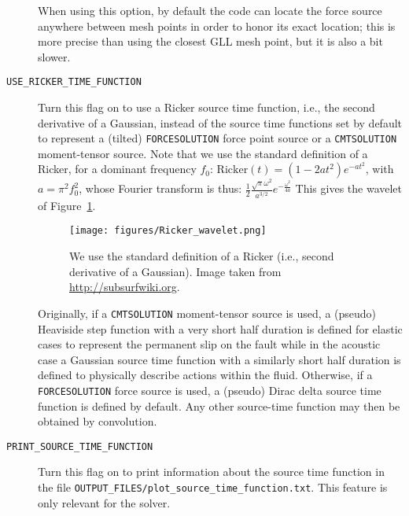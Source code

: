 \begin{description}
When using this option, by default the code can locate the force source
anywhere between mesh points in order to honor its exact location; this
is more precise than using the closest GLL mesh point, but it is also a bit slower.
\item [{\texttt{USE\_RICKER\_TIME\_FUNCTION}}] Turn this flag on to use
a Ricker source time function, i.e., the second derivative of a Gaussian, instead of the source time functions
set by default to represent a (tilted) \texttt{FORCESOLUTION} force
point source or a \texttt{CMTSOLUTION} moment-tensor source.
Note that we use the standard definition of a Ricker, for a dominant frequency $f_0$:
$\mathrm{Ricker}(t) = (1 - 2 a t^2) e^{-a t^2}$, with $a = \pi^2 f_0^2$,
whose Fourier transform is thus:
$\frac{1}{2} \frac{\sqrt{\pi}\omega^2}{a^{3/2}}e^{-\frac{\omega^2}{4 a}}$
This gives the wavelet of Figure~\ref{fig:RickerWavelet}.
\begin{figure}[htbp]
\centering
\texttt{[image: figures/Ricker\_wavelet.png]}
\caption{We use the standard definition of a Ricker (i.e., second derivative of a Gaussian). Image taken from \url{http://subsurfwiki.org}.}
\label{fig:RickerWavelet}
\end{figure}
Originally, if a \texttt{CMTSOLUTION} moment-tensor source is used, a (pseudo)
Heaviside step function with a very short half duration is defined
for elastic cases to represent the permanent slip on the fault while
in the acoustic case a Gaussian source time function with a similarly
short half duration is defined to physically describe actions within
the fluid. Otherwise, if a \texttt{FORCESOLUTION} force source is
used, a (pseudo) Dirac delta source time function is defined by default.
Any other source-time function may then be obtained by convolution.
\item [{\texttt{PRINT\_SOURCE\_TIME\_FUNCTION}}] Turn this flag on to print
information about the source time function in the file \texttt{OUTPUT\_FILES/plot\_source\_time\_function.txt}.
This feature is only relevant for the solver.
%
\end{description}

